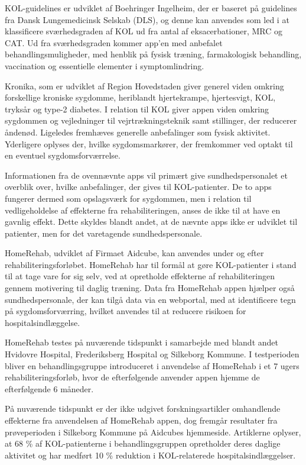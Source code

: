 KOL-guidelines er udviklet af Boehringer Ingelheim, der er baseret på guidelines fra Dansk Lungemedicinsk Selskab (DLS), og denne kan anvendes som led i at klassificere sværhedsgraden af KOL ud fra antal af eksacerbationer, MRC og CAT. Ud fra sværhedsgraden kommer app’en med anbefalet behandlingsmuligheder, med henblik på fysisk træning, farmakologisk behandling, vaccination og essentielle elementer i symptomlindring.    

Kronika, som er udviklet af Region Hovedstaden giver generel viden omkring forskellige kroniske sygdomme, heriblandt hjertekrampe, hjertesvigt, KOL, tryksår og type-2 diabetes. I relation til KOL giver appen viden omkring sygdommen og vejledninger til vejrtrækningsteknik samt stillinger, der reducerer åndenød. Ligeledes fremhæves generelle anbefalinger som fysisk aktivitet. Yderligere oplyses der, hvilke sygdomsmarkører, der fremkommer ved optakt til en eventuel sygdomsforværrelse.    

Informationen fra de ovennævnte apps vil primært give sundhedspersonalet et overblik over, hvilke anbefalinger, der gives til KOL-patienter. De to apps fungerer dermed som opslagsværk for sygdommen, men i relation til vedligeholdelse af effekterne fra rehabiliteringen, anses de ikke til at have en gavnlig effekt. 
Dette skyldes blandt andet, at de nævnte apps ikke er udviklet til patienter, men for det varetagende sundhedspersonale.   

HomeRehab, udviklet af Firmaet Aidcube, kan anvendes under og efter rehabiliteringsforløbet. HomeRehab har til formål at gøre KOL-patienter i stand til at tage vare for sig selv, ved at opretholde effekterne af rehabiliteringen gennem motivering til daglig træning. Data fra HomeRehab appen hjælper også sundhedspersonale, der kan tilgå data via en webportal, med at identificere tegn på sygdomsforværring, hvilket anvendes til at reducere risikoen for hospitalsindlæggelse. \cite{HealthcareDenmark2017}

HomeRehab testes på nuværende tidspunkt i samarbejde med blandt andet Hvidovre Hospital, Frederiksberg Hospital og Silkeborg Kommune. 
I testperioden bliver en behandlingsgruppe introduceret i anvendelse af HomeRehab i et 7 ugers rehabiliteringsforløb, hvor de efterfølgende anvender appen hjemme de efterfølgende 6 måneder. \cite{HealthcareDenmark2017}

På nuværende tidspunkt er der ikke udgivet forskningsartikler omhandlende effekterne fra anvendelsen af HomeRehab appen, dog fremgår resultater fra prøveperioden i Silkeborg Kommune på Aidcubes hjemmeside. Artiklerne oplyser, at 68 \% af KOL-patienterne i behandlingsgruppen opretholder deres daglige aktivitet og har medført 10 \% reduktion i KOL-relaterede hospitalsindlæggelser. \cite{AidCube2017}

